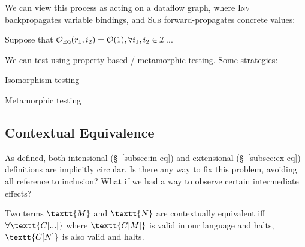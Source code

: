 \documentclass[11pt]{article}
\begin{document}
    \noindent We can view this process as acting on a dataflow graph, where \textsc{Inv} backpropagates variable bindings, and \textsc{Sub} forward-propagates concrete values:

    \hspace{-30pt}\hspace{-20pt}

    \noindent Suppose that $\mathcal{O}_{\textsc{Eq}}(r_1, i_2) = \mathcal{O}(1), \forall i_1, i_2 \in \mathcal{I}$...

    We can test using property-based / metamorphic testing. Some strategies:

    Isomorphism testing

    Metamorphic testing

    \subsection{Contextual Equivalence}

    As defined, both intensional (\S~\ref{subsec:in-eq}) and extensional (\S~\ref{subsec:ex-eq}) definitions are implicitly circular. Is there any way to fix this problem, avoiding all reference to inclusion? What if we had a way to observe certain intermediate effects?


    Two terms $\textt{M}$ and $\textt{N}$ are contextually equivalent iff $\forall \textt{C[...]}$ where $\textt{C[M]}$ is valid in our language and halts, $\textt{C[N]}$ is also valid and halts.
\end{document}
